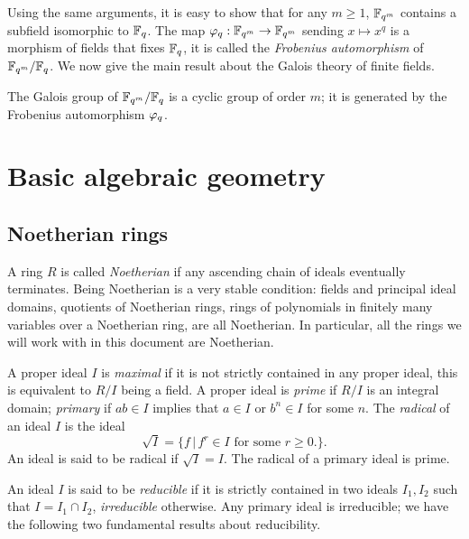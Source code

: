 Using the same arguments, it is easy to show that for any $m\ge 1$,
$\mathbb{F}_{q^m}$ contains a subfield isomorphic to $\mathbb{F}_q$.  The map
$\varphi_q:\mathbb{F}_{q^m}\rightarrow\mathbb{F}_{q^m}$ sending $x\mapsto
x^q$ is a morphism
of fields that fixes $\mathbb{F}_q$, it is called the
\emph{Frobenius automorphism} of
$\mathbb{F}_{q^m}/\mathbb{F}_q$. We now give the main result about the Galois theory
of finite fields.

\begin{proposition}
  The Galois group of $\mathbb{F}_{q^m}/\mathbb{F}_q$ is a cyclic group of order $m$;
  it is generated by the Frobenius automorphism $\varphi_q$.
\end{proposition}


\section{Basic algebraic geometry}
\label{sec:basic-algebr-geom}

\subsection{Noetherian rings}
\label{sec:noetherian-rings}
A ring $R$ is called \emph{Noetherian} if any
ascending chain of ideals eventually terminates. Being Noetherian is a
very stable condition: fields and principal ideal domains, quotients
of Noetherian rings, rings of polynomials in finitely many variables
over a Noetherian ring, are all Noetherian. In particular, all the
rings we will work with in this document are Noetherian.

A proper ideal $I$ is \emph{maximal} if it is
not strictly contained in any proper ideal, this is equivalent to
$R/I$ being a field. A proper ideal is
\emph{prime} if $R/I$ is an integral domain;
\emph{primary} if $ab\in I$ implies that $a\in
I$ or $b^n\in I$ for some $n$. The
\emph{radical} of an ideal $I$ is the
ideal
\begin{equation}
  \label{eq:212}
  \sqrt{I} = \{f \,|\, f^r\in I \text{ for some $r\ge0$.}\}
  \text{.}
\end{equation}
An ideal is said to be radical if $\sqrt{I}=I$. The radical of a
primary ideal is prime.

An ideal $I$ is said to be \emph{reducible}
if it is strictly contained in two ideals $I_1,I_2$ such that
$I=I_1\cap I_2$, \emph{irreducible}
otherwise. Any primary ideal is irreducible; we have the following two
fundamental results about reducibility.

